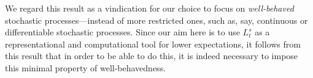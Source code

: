 \documentclass[10pt,a4paper]{paper}
\theoremstyle{definition}
\newcommand{\processes}{\mathbb{P}}
\newcommand{\wprocesses}{\processes^{\mathrm{W}}}
\newcommand{\rateset}{\mathcal{Q}}
\newcommand{\lrate}{\underline{Q}}
\begin{document}
We regard this result as a vindication for our choice to focus on \emph{well-behaved} stochastic processes---instead of more restricted ones, such as, say, continuous or differentiable stochastic processes. Since our aim here is to use $L_t^s$ as a representational and computational tool for lower expectations, it follows from this result that in order to be able to do this, it is indeed necessary to impose this minimal property of well-behavedness.%


%
%
%
\end{document}
